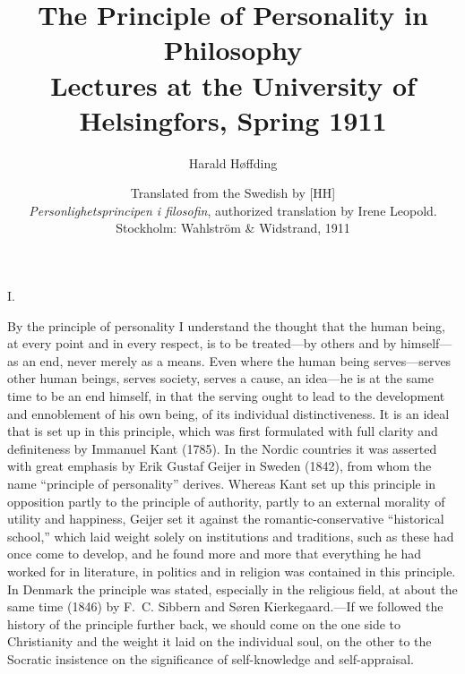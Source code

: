 \documentclass[12pt]{article}
\title{\textbf{The Principle of Personality in Philosophy}\\[0.5em]
  \large Lectures at the University of Helsingfors, Spring 1911}
\author{Harald Høffding}
\date{Translated from the Swedish by [HH]\\[0.4em]
  \textit{Personlighetsprincipen i filosofin}, authorized translation
  by Irene Leopold.\\
  Stockholm: Wahlström \& Widstrand, 1911}
\newcommand{\opage}[1]{\marginnote{\footnotesize\textit{[#1]}}}
\begin{document}
\maketitle

\opage{5}
\begin{center}\large I.\end{center}

By the principle of personality I understand the thought that the human being,
at every point and in every respect, is to be treated---by others and by
himself---as an end, never merely as a means. Even where the human being
serves---serves other human beings, serves society, serves a cause, an
idea---he is at the same time to be an end himself, in that the serving ought
to lead to the development and ennoblement of his own being, of its individual
distinctiveness. It is an ideal that is set up in this principle, which was
first formulated with full clarity and definiteness by Immanuel Kant (1785). In
the Nordic countries it was asserted with great emphasis by Erik Gustaf Geijer
in Sweden (1842), from whom the name ``principle of personality'' derives.
Whereas Kant set up this principle in opposition partly to the principle of
\opage{6}%
authority, partly to an external morality of utility and happiness, Geijer set
it against the romantic-conservative ``historical school,'' which laid weight
solely on institutions and traditions, such as these had once come to develop,
and he found more and more that everything he had worked for in literature, in
politics and in religion was contained in this principle. In Denmark the
principle was stated, especially in the religious field, at about the same time
(1846) by F.~C. Sibbern and Søren Kierkegaard.---If we followed the history of
the principle further back, we should come on the one side to Christianity and
the weight it laid on the individual soul, on the other to the Socratic
insistence on the significance of self-knowledge and self-appraisal.
\end{document}
